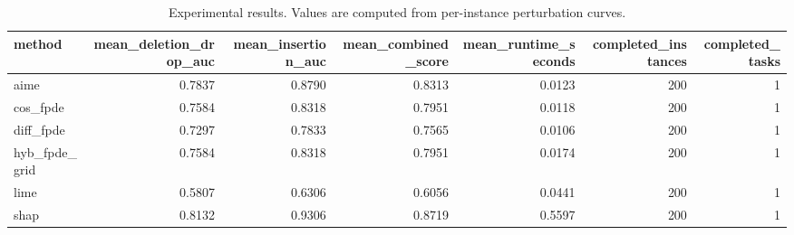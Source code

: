 \begin{table}[t]
\caption{Experimental results. Values are computed from per-instance perturbation curves.}
\label{tab:main_results_computed}
\centering
\begin{tabular}{lrrrrrr}
\toprule
method & mean\_deletion\_drop\_auc & mean\_insertion\_auc & mean\_combined\_score & mean\_runtime\_seconds & completed\_instances & completed\_tasks \\
\midrule
aime & 0.7837 & 0.8790 & 0.8313 & 0.0123 & 200 & 1 \\
cos\_fpde & 0.7584 & 0.8318 & 0.7951 & 0.0118 & 200 & 1 \\
diff\_fpde & 0.7297 & 0.7833 & 0.7565 & 0.0106 & 200 & 1 \\
hyb\_fpde\_grid & 0.7584 & 0.8318 & 0.7951 & 0.0174 & 200 & 1 \\
lime & 0.5807 & 0.6306 & 0.6056 & 0.0441 & 200 & 1 \\
shap & 0.8132 & 0.9306 & 0.8719 & 0.5597 & 200 & 1 \\
\bottomrule
\end{tabular}

\end{table}
